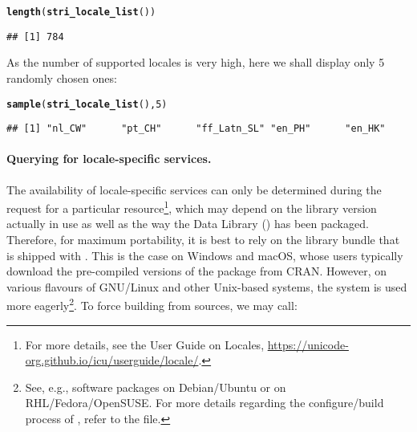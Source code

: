 \documentclass[nojss]{jss}\usepackage[]{graphicx}\usepackage[]{xcolor}
\makeatletter
\newcommand{\hlnum}[1]{\textcolor[rgb]{0.686,0.059,0.569}{#1}}%
\newcommand{\hlstd}[1]{\textcolor[rgb]{0.345,0.345,0.345}{#1}}%
\newcommand{\hlkwd}[1]{\textcolor[rgb]{0.737,0.353,0.396}{\textbf{#1}}}%
\newenvironment{kframe}{%
 \def\at@end@of@kframe{}%
 \ifinner\ifhmode%
  \def\at@end@of@kframe{\end{minipage}}%
  \begin{minipage}{\columnwidth}%
 \fi\fi%
 \def\FrameCommand##1{\hskip\@totalleftmargin \hskip-\fboxsep
 \colorbox{shadecolor}{##1}\hskip-\fboxsep
     \hskip-\linewidth \hskip-\@totalleftmargin \hskip\columnwidth}%
 \MakeFramed {\advance\hsize-\width
   \@totalleftmargin\z@ \linewidth\hsize
   \@setminipage}}%
 {\par\unskip\endMakeFramed%
 \at@end@of@kframe}
\newenvironment{knitrout}{}{} %
\makeatother
\begin{document}
\begin{knitrout}
\color{fgcolor}\begin{kframe}
\begin{alltt}
\hlkwd{length}\hlstd{(}\hlkwd{stri_locale_list}\hlstd{())}
\end{alltt}
\begin{verbatim}
## [1] 784
\end{verbatim}
\end{kframe}
\end{knitrout}

\noindent
As the number of supported locales is very high, here we shall
display only 5 randomly chosen ones:

\begin{knitrout}
\color{fgcolor}\begin{kframe}
\begin{alltt}
\hlkwd{sample}\hlstd{(}\hlkwd{stri_locale_list}\hlstd{(),} \hlnum{5}\hlstd{)}
\end{alltt}
\begin{verbatim}
## [1] "nl_CW"      "pt_CH"      "ff_Latn_SL" "en_PH"      "en_HK"
\end{verbatim}
\end{kframe}
\end{knitrout}



\paragraph{Querying for locale-specific services.}
The availability of locale-specific services can only be determined during
the request for a particular resource\footnote{For more details,
see the  User Guide on {Locales},
\url{https://unicode-org.github.io/icu/userguide/locale/}.},
which may depend on the  library version
actually in use as well as the way the  Data Library ()
has been packaged. Therefore, for maximum portability,
it is best to rely on the  library bundle that
is shipped with .
This is the case on Windows and macOS, whose users typically download the
pre-compiled versions of the package from CRAN.
However, on various flavours of GNU/Linux and other Unix-based systems,
the system  is used more eagerly\footnote{
See, e.g., software packages
 on Debian/Ubuntu or  on RHL/Fedora/OpenSUSE.
For more details regarding the configure/build process of ,
refer to the  file.}.
To force building  from sources, we may call:
\end{document}
